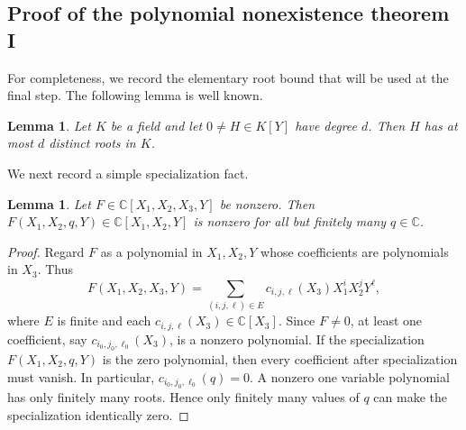 \documentclass[reqno, 12pt]{article}
\numberwithin{equation}{section}
\newtheorem{lemma}[theorem]{Lemma}
\theoremstyle{definition}
\newcommand{\CC}{\mathbb{C}}
\begin{document}
\subsection{Proof of the polynomial nonexistence theorem I}

For completeness, we record the elementary root bound that will be used at the final step.
The following lemma is well known.

\begin{lemma}\label{lem:root-bound}
Let $K$ be a field and let $0\neq H\in K[Y]$ have degree $d$.  Then $H$ has at most $d$ distinct roots in $K$.
\end{lemma}


We next record a simple specialization fact.

\begin{lemma}\label{lem:specialization}
Let $F\in\CC[X_1,X_2,X_3,Y]$ be nonzero.  Then $F(X_1,X_2,q,Y)\in\CC[X_1,X_2,Y]$ is nonzero for all but finitely many $q\in\CC$.
\end{lemma}
\begin{proof}
Regard $F$ as a polynomial in $X_1,X_2,Y$ whose coefficients are polynomials
in $X_3$.  Thus
\[F(X_1,X_2,X_3,Y)=\sum_{(i,j,\ell)\in E}c_{i,j,\ell}(X_3)X_1^iX_2^jY^\ell,
\]
where $E$ is finite and each
$c_{i,j,\ell}(X_3)\in\CC[X_3]$.  Since $F\neq0$, at least one coefficient, say $c_{i_0,j_0,\ell_0}(X_3)$, is a nonzero polynomial.
If the specialization $F(X_1,X_2,q,Y)$ is the zero polynomial, then every coefficient after specialization must vanish.  In particular, $c_{i_0,j_0,\ell_0}(q)=0$.
A nonzero one variable polynomial has only finitely many roots.  Hence only finitely many values of $q$ can make the specialization identically zero.
\end{proof}
\end{document}
